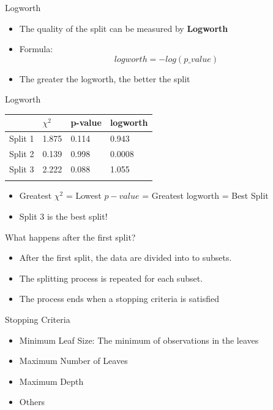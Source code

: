 \documentclass[
  ignorenonframetext,
]{beamer}
\providecommand{\tightlist}{%
  \setlength{\itemsep}{0pt}\setlength{\parskip}{0pt}}
\begin{document}
\begin{frame}{Logworth}
\label{logworth}
\begin{itemize}
\tightlist
\item
  The quality of the split can be measured by \textbf{Logworth}
\item
  Formula: \[logworth = -log(p\text{_}value)\]
\item
  The greater the logworth, the better the split
\end{itemize}
\end{frame}

\begin{frame}{Logworth}
\label{logworth-1}
\begin{longtable}[]{@{}llll@{}}
\toprule\noalign{}
& \(\chi^2\) & p-value & logworth \\
\midrule\noalign{}
\endhead
Split 1 & 1.875 & 0.114 & 0.943 \\
Split 2 & 0.139 & 0.998 & 0.0008 \\
Split 3 & 2.222 & 0.088 & 1.055 \\
\bottomrule\noalign{}
\end{longtable}

\begin{itemize}
\item
  Greatest \(\chi^2\) = Lowest \(p-value\) = Greatest logworth = Best
  Split
\item
  Split 3 is the best split!
\end{itemize}
\end{frame}

\begin{frame}{What happens after the first split?}
\label{what-happens-after-the-first-split}
\begin{itemize}
\tightlist
\item
  After the first split, the data are divided into to subsets.
\item
  The splitting process is repeated for each subset.
\item
  The process ends when a stopping criteria is satisfied
\end{itemize}
\end{frame}

\begin{frame}{Stopping Criteria}
\label{stopping-criteria}
\begin{itemize}
\tightlist
\item
  Minimum Leaf Size: The minimum of observations in the leaves
\item
  Maximum Number of Leaves
\item
  Maximum Depth
\item
  Others
\end{itemize}
\end{frame}
\end{document}
